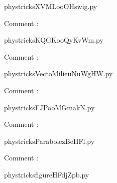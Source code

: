     \newcommand{\CaptionFigXVMLooOHswig}{<+Type your caption here+>}
    \begin{center}
        
    \end{center}
    phystricksXVMLooOHswig.py

    Comment : 

    \clearpage
    


    \newcommand{\CaptionFigKQGKooQyKvWm}{<+Type your caption here+>}
    \begin{center}
        
    \end{center}
    phystricksKQGKooQyKvWm.py

    Comment : 

    \clearpage
    


    \newcommand{\CaptionFigVectoMilieuNuWgHW}{<+Type your caption here+>}
    \begin{center}
        
    \end{center}
    phystricksVectoMilieuNuWgHW.py

    Comment : 

    \clearpage
    


    \newcommand{\CaptionFigFJPooMGmakN}{<+Type your caption here+>}
    \begin{center}
        
    \end{center}
    phystricksFJPooMGmakN.py

    Comment : 

    \clearpage
    


    \newcommand{\CaptionFigParabolezBeHFl}{<+Type your caption here+>}
    \begin{center}
        
    \end{center}
    phystricksParabolezBeHFl.py

    Comment : 

    \clearpage
    


    \newcommand{\CaptionFigfigureHFdjZpb}{<+Type your caption here+>}
    \begin{center}
        
    \end{center}
    phystricksfigureHFdjZpb.py

